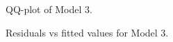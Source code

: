 \documentclass[review,12pt,authoryear]{elsarticle}
\begin{document}
\begin{linenumbers}
\begin{figure}
  \caption{QQ-plot of Model 3.}
\end{figure}

\begin{figure}
  \caption{Residuals vs fitted values for Model 3.}
\end{figure}


\end{linenumbers}
\end{document}
